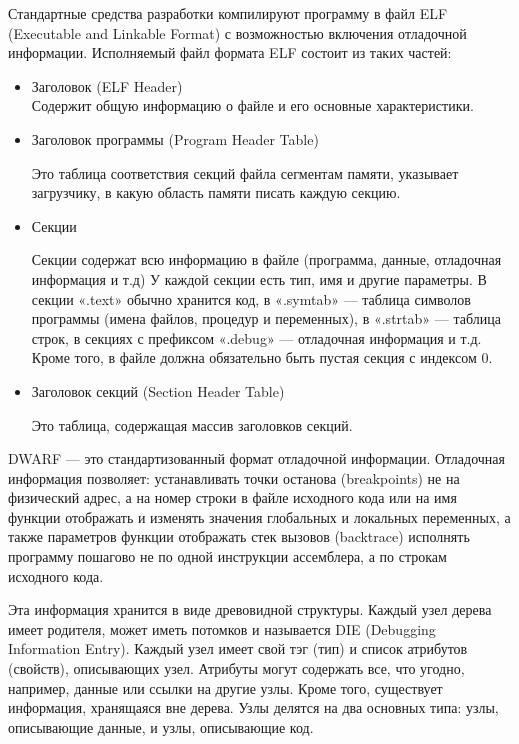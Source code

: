 \documentclass[oneside,final,14pt]{extreport}
\begin{document}
Стандартные средства разработки компилируют программу в файл ELF (Executable and Linkable Format) с возможностью включения отладочной информации.
Исполняемый файл формата ELF состоит из таких частей:
	\begin{itemize}
	\item Заголовок (ELF Header) \\
	Содержит общую информацию о файле и его основные характеристики.
	\item Заголовок программы (Program Header Table)
	
	Это таблица соответствия секций файла сегментам памяти, указывает загрузчику, в какую область памяти писать каждую секцию.
	\item Секции
	
	Секции содержат всю информацию в файле (программа, данные, отладочная информация и т.д)
	У каждой секции есть тип, имя и другие параметры. В секции «.text» обычно хранится код, в «.symtab» — таблица символов программы (имена файлов, процедур и переменных), в «.strtab» — таблица строк, в секциях с префиксом «.debug» — отладочная информация и т.д. Кроме того, в файле должна обязательно быть пустая секция с индексом 0.
	\item Заголовок секций (Section Header Table)
	
	Это таблица, содержащая массив заголовков секций.\\
    \end{itemize}

	DWARF — это стандартизованный формат отладочной информации.
	Отладочная информация позволяет:
	устанавливать точки останова (breakpoints) не на физический адрес, а на номер строки в файле исходного кода или на имя функции
	отображать и изменять значения глобальных и локальных переменных, а также параметров функции
	отображать стек вызовов (backtrace)
	исполнять программу пошагово не по одной инструкции ассемблера, а по строкам исходного кода.
	
	Эта информация хранится в виде древовидной структуры. Каждый узел дерева имеет родителя, может иметь потомков и называется DIE (Debugging Information Entry). Каждый узел имеет свой тэг (тип) и список атрибутов (свойств), описывающих узел. Атрибуты могут содержать все, что угодно, например, данные или ссылки на другие узлы. Кроме того, существует информация, хранящаяся вне дерева.
	Узлы делятся на два основных типа: узлы, описывающие данные, и узлы, описывающие код.
\end{document}
